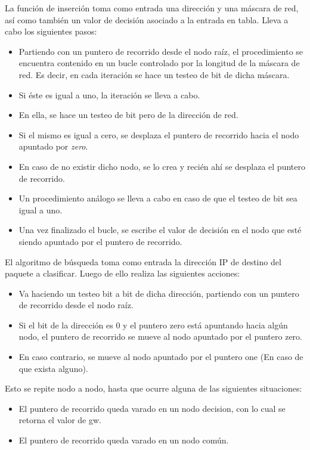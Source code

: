 La función de inserción toma como entrada una dirección y una máscara de red, así como también un valor de decisión asociado a la entrada en tabla. Lleva a cabo los siguientes pasos:
\begin{itemize}
	\item Partiendo con un puntero de recorrido desde el nodo raíz, el procedimiento se encuentra contenido en un bucle controlado por la longitud de la máscara de red. Es decir, en cada iteración se hace un testeo de bit de dicha máscara. 
	\item Si éste es igual a uno, la iteración se lleva a cabo.
	\item En ella, se hace un testeo de bit pero de la dirección de red.
	\item Si el mismo es igual a cero, se desplaza el puntero de recorrido hacia el nodo apuntado por \textit{zero}.
	\item En caso de no existir dicho nodo, se lo crea y recién ahí se desplaza el puntero de recorrido.
	\item Un procedimiento análogo se lleva a cabo en caso de que el testeo de bit sea igual a uno.
	\item Una vez finalizado el bucle, se escribe el valor de decisión en el nodo que esté siendo apuntado por el puntero de recorrido.
\end{itemize}


El algoritmo de búsqueda toma como entrada la dirección IP de destino del paquete a clasificar. Luego de ello realiza las siguientes acciones:
\begin{itemize}
	\item Va haciendo un testeo bit a bit de dicha dirección, partiendo con un puntero de recorrido desde el nodo raíz.
	\item Si el bit de la dirección es 0 y el puntero zero está apuntando hacia algún nodo, el puntero de recorrido se mueve al nodo apuntado por el puntero zero.
	\item En caso contrario, se mueve al nodo apuntado por el puntero one (En caso de que exista alguno).
\end{itemize}

Esto se repite nodo a nodo, hasta que ocurre alguna de las siguientes situaciones:

\begin{itemize}
    	\item El puntero de recorrido queda varado en un nodo decision, con lo cual se retorna el valor de gw.
    	\item El puntero de recorrido queda varado en un nodo común. 
\end{itemize}


